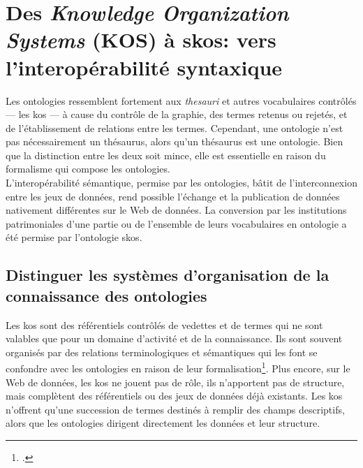 \section{\label{II-B-2}Des \textit{Knowledge Organization Systems} (KOS) à \ac{skos}: vers l'interopérabilité syntaxique}

Les ontologies ressemblent fortement aux \textit{thesauri} et autres vocabulaires contrôlés --- les \ac{kos} --- à cause du contrôle de la graphie, des termes retenus ou rejetés, et de l'établissement de relations entre les termes. Cependant, une ontologie n'est pas nécessairement un thésaurus, alors qu'un thésaurus est une ontologie. Bien que la distinction entre les deux soit mince, elle est essentielle en raison du formalisme qui compose les ontologies.\\

L'interopérabilité sémantique, permise par les ontologies, bâtit de l'interconnexion entre les jeux de données, rend possible l'échange et la publication de données nativement différentes sur le Web de données. La conversion par les institutions patrimoniales d'une partie ou de l'ensemble de leurs vocabulaires en ontologie a été permise par l'ontologie \ac{skos}.

\subsection{\label{II-B-2-a}Distinguer les systèmes d'organisation de la connaissance des ontologies}

Les \ac{kos} sont des référentiels contrôlés de vedettes et de termes qui ne sont valables que pour un domaine d'activité et de la connaissance. Ils sont souvent organisés par des relations terminologiques et sémantiques qui les font se confondre avec les ontologies en raison de leur formalisation\footcite[p.48]{dalbin_approches_2011}. Plus encore, sur le Web de données, les \ac{kos} ne jouent pas de rôle, ils n'apportent pas de structure, mais complètent des référentiels ou des jeux de données déjà existants. Les \ac{kos} n'offrent qu'une succession de termes destinés à remplir des champs descriptifs, alors que les ontologies dirigent directement les données et leur structure.\\

